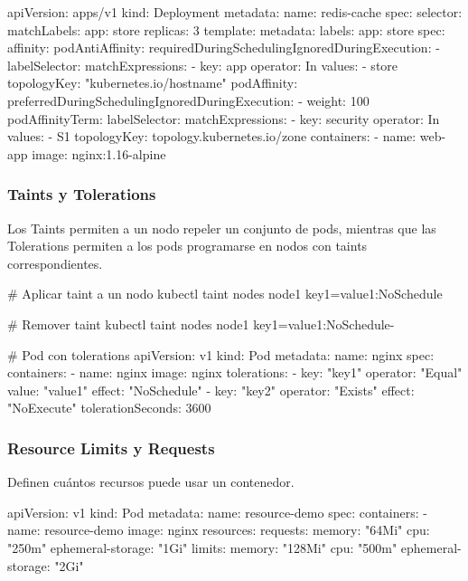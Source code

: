 \documentclass[11pt,a4paper]{article}
\begin{document}
\begin{commandbox}
apiVersion: apps/v1
kind: Deployment
metadata:
  name: redis-cache
spec:
  selector:
    matchLabels:
      app: store
  replicas: 3
  template:
    metadata:
      labels:
        app: store
    spec:
      affinity:
        podAntiAffinity:
          requiredDuringSchedulingIgnoredDuringExecution:
          - labelSelector:
              matchExpressions:
              - key: app
                operator: In
                values:
                - store
            topologyKey: "kubernetes.io/hostname"
        podAffinity:
          preferredDuringSchedulingIgnoredDuringExecution:
          - weight: 100
            podAffinityTerm:
              labelSelector:
                matchExpressions:
                - key: security
                  operator: In
                  values:
                  - S1
              topologyKey: topology.kubernetes.io/zone
      containers:
      - name: web-app
        image: nginx:1.16-alpine
\end{commandbox}

\subsubsection{Taints y Tolerations}

Los Taints permiten a un nodo repeler un conjunto de pods, mientras que las Tolerations permiten a los pods programarse en nodos con taints correspondientes.

\begin{commandbox}
\# Aplicar taint a un nodo
kubectl taint nodes node1 key1=value1:NoSchedule

\# Remover taint
kubectl taint nodes node1 key1=value1:NoSchedule-

\# Pod con tolerations
apiVersion: v1
kind: Pod
metadata:
  name: nginx
spec:
  containers:
  - name: nginx
    image: nginx
  tolerations:
  - key: "key1"
    operator: "Equal"
    value: "value1"
    effect: "NoSchedule"
  - key: "key2"
    operator: "Exists"
    effect: "NoExecute"
    tolerationSeconds: 3600
\end{commandbox}

\subsubsection{Resource Limits y Requests}

Definen cuántos recursos puede usar un contenedor.

\begin{commandbox}
apiVersion: v1
kind: Pod
metadata:
  name: resource-demo
spec:
  containers:
  - name: resource-demo
    image: nginx
    resources:
      requests:
        memory: "64Mi"
        cpu: "250m"
        ephemeral-storage: "1Gi"
      limits:
        memory: "128Mi"
        cpu: "500m"
        ephemeral-storage: "2Gi"
\end{commandbox}
\end{document}
